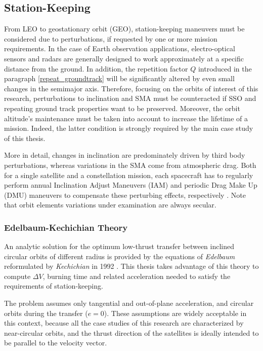 \subsection{Station-Keeping}
From LEO to geostationary orbit (GEO), station-keeping maneuvers must be considered due to perturbations, if requested by one or more mission requirements.  
In the case of Earth observation applications, electro-optical sensors and radars are generally designed to work approximately at a specific distance from the ground. 
In addition, the repetition factor $Q$ introduced in the paragraph \ref{repeat_groundtrack} will be significantly altered by even small changes in the semimajor axis.
Therefore, focusing on the orbits of interest of this research, perturbations to inclination and SMA must be counteracted if SSO and repeating ground track properties want to be preserved.
Moreover, the orbit altitude's maintenance must be taken into account to increase the lifetime of a mission.
Indeed, the latter condition is strongly required by the main case study of this thesis.

More in detail, changes in inclination are predominately driven by third body perturbations, whereas variations in the SMA come from atmospheric drag.
Both for a single satellite and a constellation mission, each spacecraft has to regularly perform annual Inclination Adjust Maneuvers (IAM) and periodic Drag Make Up (DMU) maneuvers to compensate these perturbing effects, respectively \cite{johnson2014maintaining}.
Note that orbit elements variations under examination are always secular.

\subsubsection{Edelbaum-Kechichian Theory}
An analytic solution for the optimum low-thrust transfer between inclined circular orbits of different radius is provided by the equations of \textit{Edelbaum} reformulated by \textit{Kechichian} in 1992 \cite{edelbaum1961propulsion, kechichian1992reformulation}.
This thesis takes advantage of this theory to compute $\Delta V$, burning time and related acceleration needed to satisfy the requirements of station-keeping.

The problem assumes only tangential and out-of-plane acceleration, and circular orbits during the transfer ($e = 0$).
These assumptions are widely acceptable in this context, because all the case studies of this research are characterized by near-circular orbits, and the thrust direction of the satellites is ideally intended to be parallel to the velocity vector.

